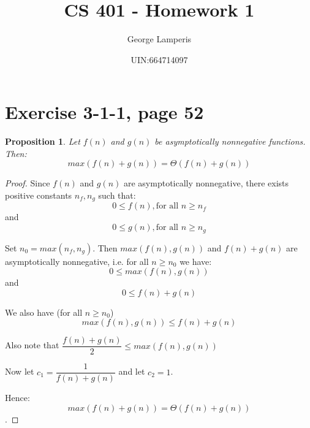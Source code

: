 \documentclass[letterpaper, 11pt]{article}
\title{CS 401 - Homework 1}
\author{George Lamperis}
\date{UIN:664714097}
\theoremstyle{mystyle}
\newtheorem*{prop}{Proposition}
\begin{document}
\maketitle


\section{Exercise 3-1-1, page 52}

\begin{prop}
    Let $f(n)$ and $g(n)$ be asymptotically nonnegative functions. Then:
    \[max(f(n) + g(n)) = \Theta (f(n) + g(n))\]
\end{prop}

\begin{proof}
    Since $f(n)$ and $g(n)$ are asymptotically nonnegative, there exists positive
    constants $n_f, n_g$ such that:
    \begin{equation} 0 \leq f(n), \text{for all } n \geq n_f \end{equation}
    and
    \begin{equation} 0 \leq g(n), \text{for all } n \geq n_g \end{equation}

    Set $n_0 = max(n_f, n_g)$. Then $max(f(n), g(n))$ and $f(n) + g(n)$ are asymptotically
    nonnegative, i.e. for all $n \geq n_0$ we have:
    \begin{equation} 0 \leq max(f(n), g(n)) \end{equation}
    and
    \begin{equation} 0 \leq f(n)+g(n) \end{equation}

    We also have (for all $n \geq n_0$)
    \begin{equation} max(f(n), g(n)) \leq f(n)+g(n) \end{equation}

    Also note that $ \dfrac{f(n)+g(n)}{2} \leq max(f(n), g(n))$

    Now let $c_1 = \dfrac{1}{f(n) + g(n)}$ and let $c_2 = 1$.

    Hence: \[max(f(n) + g(n)) = \Theta (f(n) + g(n))\].
\end{proof}


\end{document}
